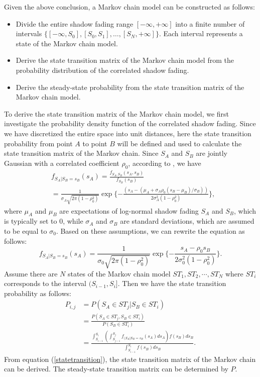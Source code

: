 \par Given the above conclusion, a Markov chain model can be constructed as follows:
\begin{itemize}
\item Divide the entire shadow fading range $[-\infty,+\infty]$ into a finite number of intervals $\{[-\infty,S_{0}],[S_{0},S_{1}],\dots,[S_{N},+\infty]\}$. Each interval represents a state of the Markov chain model.
\item Derive the state transition matrix of the Markov chain model from the probability distribution of the correlated shadow fading.
\item Derive the steady-state probability from the state transition matrix of the Markov chain model.
\end{itemize}
\par To derive the state transition matrix of the Markov chain model, we first investigate the probability density function of the correlated shadow fading. Since we have discretized the entire space into unit distances, here the state transition probability from point $A$ to point $B$ will be defined and used to calculate the state transition matrix of the Markov chain. Since $S_{A}$ and $S_{B}$ are jointly Gaussian with a correlated coefficient $\rho_{0}$, according to \cite{papoulis2002probability}, we have
\begin{equation}
\begin{split}
& f_{S_{A}|S_{B} =s_{B}}(s_{A}) =\frac{f_{S_{A},S_{B}}(s_{A},s_{B})}{f_{S_{B}}(s_{B})}\\
&=\frac{1}{\sigma_{A}\sqrt{2\pi(1-\rho_{0}^{2})}}\exp\{-\frac{(s_{A}-(\mu_{A}+\sigma_{A}\rho_{0}(s_{B}-\mu_{B})/\sigma_{B}))}{2\sigma_{A}^{2}(1-\rho_{0}^{2})}\},
\end{split}
\end{equation}
where $\mu_{A}$ and $\mu_{B}$ are expectations of log-normal shadow fading $S_{A}$ and $S_{B}$, which is typically set to $0$, while $\sigma_{A}$ and $\sigma_{B}$ are standard deviations, which are assumed to be equal to $\sigma_{0}$. Based on these assumptions, we can rewrite the equation as follows:
\begin{equation}
f_{S_{A}|S_{B} =s_{B}}(s_{A}) =\frac{1}{\sigma_{0}\sqrt{2\pi(1-\rho_{0}^{2})}}\exp\{-\frac{s_{A}-\rho_{0}s_{B}}{2\sigma_{0}^{2}(1-\rho_{0}^{2})}\}.
\end{equation}
Assume there are $N$ states of the Markov chain model $ST_{1}, ST_{2},\cdots, ST_{N}$ where $ST_{i}$ corresponds to the interval $(S_{i-1}, S_{i}]$. Then we have the state transition probability as follows:
\begin{equation}
\label{statetransition}
\begin{split}
P_{i,j} &= P(S_{A}\in ST_{j}|S_{B}\in ST_{i})\\
&=\frac{P(S_{A}\in ST_{j}, S_{B}\in ST_{i})}{P(S_{B}\in ST_{i})}\\
&=\frac{\int_{S_{i-1}}^{S_{i}}(\int_{S_{j-1}}^{S_{j}}f_{(S_{A}|S_{B}=s_{B}}(s_{A})ds_{A})f(s_{B})ds_{B}}{\int_{S_{i-1}}^{S_{i}}f(s_{B})ds_{B}}.
\end{split}
\end{equation}
From equation (\ref{statetransition}), the state transition matrix of the Markov chain can be derived. The steady-state transition matrix can be determined by $P$.
